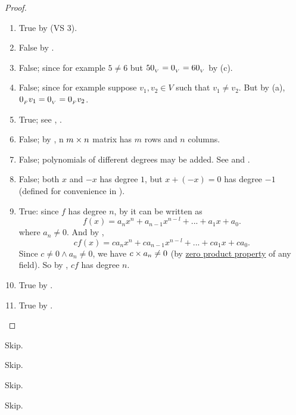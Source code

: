 \begin{proof}
\begin{enumerate}
\item True by (VS 3).
\item False by .
\item False; since for example \(5 \ne 6\) but \(5 0_{_V} = 0_{_V} = 6 0_{_V}\) by (c).
\item False; since for example suppose \(v_1, v_2 \in V\) such that \(v_1 \ne v_2\).
    But by (a), \(0_{_F} v_1 = 0_{_V} = 0_{_F} v_2\).
\item True; see , .
\item False; by , n \(m \times n\) matrix has \(m\) rows and \(n\) columns.
\item False; polynomials of different degrees may be added. See  and .
\item False; both \(x\) and \(-x\) has degree \(1\), but \(x + (-x) = 0\) has degree \(-1\) (defined for convenience in ).
\item True: since \(f\) has degree \(n\), by  it can be written as
    \[
        f(x) = {a_n} x^n + a_{n-1} x^{n-l} + ... + a_1 x + a_0.
    \]
    where \(a_n \ne 0\).
    And by ,
    \[
        cf(x) = c {a_n} x^n + c a_{n-1} x^{n-l} + ... + c a_1 x + c a_0.
    \]
    Since \(c \ne 0 \land a_n \ne 0\), we have \(c \times a_n \ne 0\) (by \href{https://www.wikiwand.com/en/Zero-product_property}{zero product property} of any field).
    So by , \(cf\) has degree \(n\).
\item True by .
\item True by .
\end{enumerate}
\end{proof}

\begin{exercise} \label{exercise 1.2.2}
Skip.
\end{exercise}

\begin{exercise} \label{exercise 1.2.3}
Skip.
\end{exercise}

\begin{exercise} \label{exercise 1.2.4}
Skip.
\end{exercise}

\begin{exercise} \label{exercise 1.2.5}
Skip.
\end{exercise}

